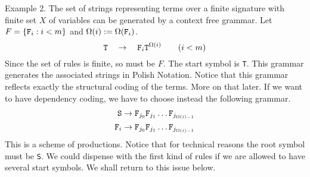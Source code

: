 {\sc Example 2.}
The set of strings representing terms over a finite signature with
finite set $X$ of variables can be generated by a context free
grammar. Let $F = \{\mbox{\tt F}_i : i < m\}$ and
$\Omega(i) := \Omega(\mbox{\tt F}_i)$.
\begin{equation}
\mbox{\tt T} \quad\rightarrow\quad \mbox{\tt F}_i\mbox{\tt T}^{\Omega(i)} 
\qquad (i < m)
\end{equation}
Since the set of rules is finite, so must be $F$.
The start symbol is {\tt T}. This grammar generates the associated
strings in 
Polish Notation. Notice that this grammar reflects
exactly the structural coding of the terms. More on that later.
If we want to have dependency coding, we  have to choose instead
the following grammar.
\begin{equation}
\begin{split}
\mbox{\tt S} & \rightarrow \mbox{\tt F}_{j_0}\mbox{\tt F}_{j_1}\dotso
\mbox{\tt F}_{j_{\Omega(i)-1}} \\
\mbox{\tt F}_i & \rightarrow \mbox{\tt F}_{j_0}\mbox{\tt F}_{j_1}\dotso
\mbox{\tt F}_{j_{\Omega(i)-1}}
\end{split}
\end{equation}
This is a scheme of productions. Notice that for technical reasons 
the root symbol must be {\tt S}. We could dispense with the first 
kind of rules if we are allowed to have several start symbols. We 
shall return to this issue below.


